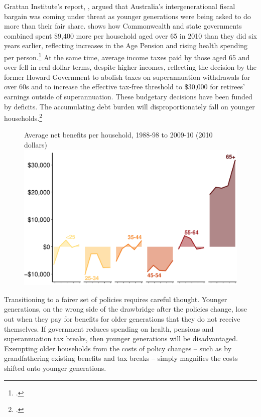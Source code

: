Grattan Institute’s report, , argued that Australia’s intergenerational fiscal bargain was coming under threat as younger generations were being asked to do more than their fair share.  shows how Commonwealth and state governments combined spent \$9,400 more per household aged over 65 in 2010 than they did six years earlier, reflecting increases in the Age Pension and rising health spending per person.\footcite[][22]{DaleyWoodWeidmannEtAl2014}  At the same time, average income taxes paid by those aged 65 and over fell in real dollar terms, despite higher incomes, reflecting the decision by the former Howard Government to abolish taxes on superannuation withdrawals for over 60s and to increase the effective tax-free threshold to \$30,000 for retirees’ earnings outside of superannuation. These budgetary decisions have been funded by deficits. The accumulating debt burden will disproportionately fall on younger households.\footcite[][29]{DaleyWoodWeidmannEtAl2014}

\begin{figure}
%
{Average net benefits per household, 1988-98 to 2009-10 (2010 dollars)}\label{fig:SUPER-Wealth-of-generations-chart}
\includegraphics[width=\columnwidth]{super-atlas/Figure1-helvet-1.pdf}

\end{figure}
Transitioning to a fairer set of policies requires careful thought. Younger generations, on the wrong side of the drawbridge after the policies change, lose out when they pay for benefits for older generations that they do not receive themselves. If government reduces spending on health, pensions and superannuation tax breaks, then younger generations will be disadvantaged. Exempting older households from the costs of policy changes – such as by grandfathering existing benefits and tax breaks – simply magnifies the costs shifted onto younger generations. 


